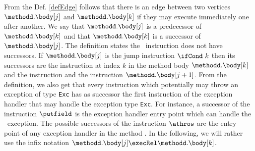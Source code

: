 From the Def. \ref{defEdge} follows that there is an edge between two vertices $\methodd.\body[j]$ and  $\methodd.\body[k]$ if they may execute immediately one after another.
 We say that $\methodd.\body[j]$ is a predecessor of $\methodd.\body[k]$ and that  $\methodd.\body[k]$ is a successor of  $\methodd.\body[j]$.
 The definition states the \return \  instruction  does not have successors.
If  $\methodd.\body[j ]$ is the jump instruction $ \ifCond \ k $ then  its successors are the instruction at index $k$ in the method body   
$\methodd.\body[k]$ and the instruction and the instruction $\methodd.\body[j + 1 ]$. 
From the definition, we also get that every instruction which potentially may throw an exception of type \texttt{Exc}
has as successor the first instruction of the exception handler that may handle the exception type \texttt{Exc}. For instance, a successor
of the instruction $\putfield$ is the exception handler entry point which can handle  the \NullPointerExc \ exception. 
The possible successors of the instruction $\athrow$ are the entry point of any  exception handler  in the method \methodd.
In the following, we will rather use the infix notation $\methodd.\body[j] \execRel \methodd.\body[k]$.


